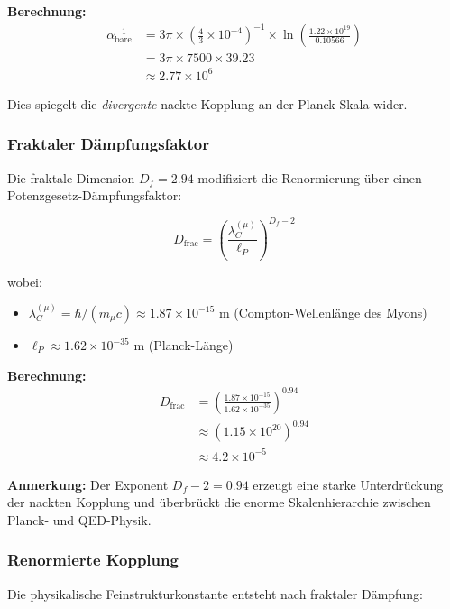 \documentclass[12pt,a4paper]{article}
\numberwithin{equation}{section}
\begin{document}
\textbf{Berechnung:}
\begin{align}
	\alpha_{\text{bare}}^{-1} &= 3\pi \times \left(\frac{4}{3} \times 10^{-4}\right)^{-1} \times \ln\left(\frac{1.22 \times 10^{19}}{0.10566}\right)\\
	&= 3\pi \times 7500 \times 39.23\\
	&\approx 2.77 \times 10^6
	\label{eq:nackte_berechnung}
\end{align}

Dies spiegelt die \emph{divergente} nackte Kopplung an der Planck-Skala wider.

\subsubsection{Fraktaler Dämpfungsfaktor}

Die fraktale Dimension $D_f = 2.94$ modifiziert die Renormierung über einen Potenzgesetz-Dämpfungsfaktor:

\begin{equation}
	D_{\text{frac}} = \left(\frac{\lambda_C^{(\mu)}}{\ell_P}\right)^{D_f - 2}
	\label{eq:daempfung_definition}
\end{equation}

wobei:
\begin{itemize}
	\item $\lambda_C^{(\mu)} = \hbar / (m_\mu c) \approx 1.87 \times 10^{-15}$ m (Compton-Wellenlänge des Myons)
	\item $\ell_P \approx 1.62 \times 10^{-35}$ m (Planck-Länge)
\end{itemize}

\textbf{Berechnung:}
\begin{align}
	D_{\text{frac}} &= \left(\frac{1.87 \times 10^{-15}}{1.62 \times 10^{-35}}\right)^{0.94}\\
	&\approx (1.15 \times 10^{20})^{0.94}\\
	&\approx 4.2 \times 10^{-5}
	\label{eq:daempfung_berechnung}
\end{align}

\textbf{Anmerkung:} Der Exponent $D_f - 2 = 0.94$ erzeugt eine starke Unterdrückung der nackten Kopplung und überbrückt die enorme Skalenhierarchie zwischen Planck- und QED-Physik.

\subsubsection{Renormierte Kopplung}

Die physikalische Feinstrukturkonstante entsteht nach fraktaler Dämpfung:
\end{document}
